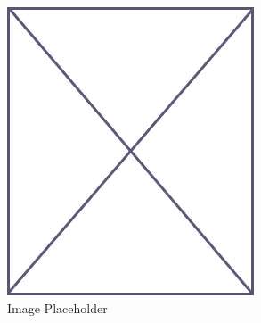 \begin{figure}
\begin{center}
\vspace{-32pt}
\includegraphics[scale=.45]{figs/placeholder}
\end{center}
\vspace{-12pt}
\caption{Image Placeholder}
\label{fig:placeholder_app}
\end{figure}
